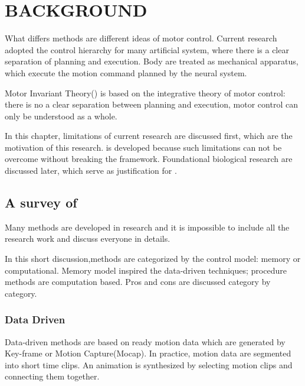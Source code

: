 \chapter{BACKGROUND}
\label{chap:background}

What differs \cms methods are different ideas of motor control.
Current \cms research adopted the control hierarchy for many artificial system,
where there is a clear separation of planning and execution.
Body are treated as mechanical apparatus, which execute the motion command planned by the neural system.

Motor Invariant Theory(\moit) is based on the integrative theory of motor control\citep{dickinson2000animals}:
there is no a clear separation between planning and execution,  motor control can only be understood as a whole.

In this chapter, limitations of current \cms research are discussed first, which are the motivation of this research.
\moit is developed because such limitations can not be overcome without breaking the framework.
Foundational biological research are discussed later,  which serve as justification for \moit.



\section{A survey of \cms}

Many methods are developed in \cms research and it is impossible to include all the research work and discuss everyone in details.

In this short discussion,\cms methods are categorized by the control model: memory or computational.
Memory model inspired the data-driven techniques;
procedure methods are computation based.
Pros and cons are discussed category by category.

\subsection{Data Driven}
Data-driven methods are based on ready motion data which are generated by Key-frame or Motion Capture(Mocap). 
In practice, motion data are segmented into short time clips. 
An animation is synthesized by selecting motion clips and connecting them together\citep{Parent2002,kovar2003flexible}.

